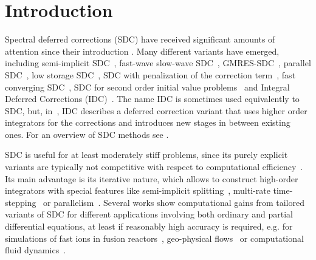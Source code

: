 \documentclass[sn-mathphys-num]{sn-jnl}%
\newcommand{\revb}[1]{#1}%
\theoremstyle{thmstyleone}%
\theoremstyle{thmstyletwo}%
\theoremstyle{thmstylethree}%
\begin{document}
\section{Introduction}\label{sec:intro} 

Spectral deferred corrections (SDC) have received significant amounts of attention since their introduction \citep{DuttEtAl2000}. 
Many different variants have emerged, including semi-implicit SDC~\citep{Minion2003}, fast-wave slow-wave SDC~\citep{RuprechtSpeck2016}, GMRES-SDC~\citep{HuangEtAl2006}, parallel SDC~\citep{Speck2017}, low storage SDC~\citep{Crockatt2018}, SDC with penalization of the correction term~\citep{ShuEtAl2007}, fast converging SDC~\citep{Weiser2014}, SDC for second order initial value problems~\citep{WinkelEtAl2015} and Integral Deferred Corrections (IDC)~\citep{ChristliebEtAl2009}. 
The name IDC is sometimes used equivalently to SDC, but, in~\citep{ChristliebEtAl2009}, IDC describes a deferred correction variant that uses higher order integrators for the corrections and introduces new stages in between existing ones. 
For an overview of SDC methods see \citep{OngEtAl2020sdc}.

\revb{SDC is useful for at least moderately stiff problems, since its purely explicit variants are typically not competitive with respect to computational efficiency~\cite{Ketcheson2014}.
Its main advantage is its iterative nature, which allows to construct high-order integrators with special features like semi-implicit splitting~\cite{Minion2003}, multi-rate time-stepping~\cite{NaumannEtAl2018} or parallelism~\cite{Speck2018}.
Several works show computational gains from tailored variants of SDC for different applications involving both ordinary and partial differential equations,  at least if reasonably high accuracy is required, e.g. for simulations of fast ions in fusion reactors~\cite{TretiakEtAl2021}, geo-physical flows~\cite{BrownEtAl2025} or computational fluid dynamics~\cite{guesmi2023assessment}.
}
\end{document}
